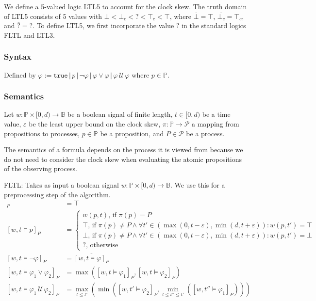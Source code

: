 \documentclass[envcountsame, runningheads]{llncs}
\newcommand{\B}{\mathbb{B}}
\def\until{\,\mathcal{U}\,}
\def\since{\,\mathcal{S}\,}
\newcommand{\?}{\text{?}}
\begin{document}
	We define a 5-valued logic LTL5 to account for the clock skew.
	The truth domain of LTL5 consists of 5 values with $\bot < \bot_c < \? < \top_c < \top$, where $\overline{\bot} = \top$, $\overline{\bot_c} = \top_c$, and $\overline{\?} = \?$.
	To define LTL5, we first incorporate the value $\?$ in the standard logics FLTL and LTL3.
	
	\subsubsection*{Syntax}
	Defined by
	$ \varphi := \texttt{true} \,|\, p \,|\, \lnot \varphi \,|\, \varphi \lor \varphi \,|\, \varphi \until \varphi $
	where $p \in \mathbb{P}$.
	
	\subsubsection*{Semantics}
	Let $w : \mathbb{P} \times [0,d) \to \B$ be a boolean signal of finite length, $t \in [0,d)$ be a time value, $\varepsilon$ be the least upper bound on the clock skew, $\pi : \mathbb{P} \to \mathcal{P}$ a mapping from propositions to processes, $p \in \mathbb{P}$ be a proposition, and $P \in \mathcal{P}$ be a process.
	
	The semantics of a formula depends on the process it is viewed from because we do not need to consider the clock skew when evaluating the atomic propositions of the observing process.
	
	FLTL: Takes as input a boolean signal $w : \mathbb{P} \times [0,d) \to \B$. We use this for a preprocessing step of the algorithm.
	\begin{align*}
		[w,t \models \texttt{true}]_P &= \top \\
		[w,t \models p]_P &= \begin{cases}
			w(p,t) \text{, if } \pi(p) = P\\
			\top \text{, if } \pi(p) \not = P \land \forall t' \in (\max(0, t - \varepsilon), \min(d, t + \varepsilon)) : w(p, t') = \top\\
			\bot \text{, if } \pi(p) \not = P \land \forall t' \in (\max(0, t - \varepsilon), \min(d, t + \varepsilon)) : w(p, t') = \bot\\
			? \text{, otherwise}
		\end{cases} \\
		[w,t \models \lnot \varphi]_P &= \overline{[w,t \models \varphi]_P}\\
		[w,t \models \varphi_1 \lor \varphi_2]_P &= \max([w,t \models \varphi_1]_P, [w,t \models \varphi_2]_P)\\
		[w,t \models \varphi_1 \until \varphi_2]_P &= \max_{t \leq t'} \left( \min \left( [w,t' \models \varphi_2]_P, \min_{t \leq t'' \leq t'} \left( [w,t'' \models \varphi_1]_P \right) \right) \right)\\
	\end{align*}
	
\end{document}
